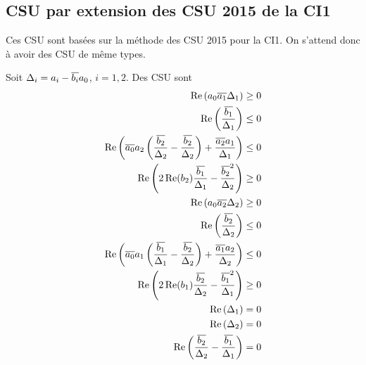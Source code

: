 

\subsection{CSU par extension des CSU 2015 de la CI1}

  Ces CSU sont basées sur la méthode des CSU 2015 pour la CI1. On s'attend donc à avoir des CSU de même types.

  \begin{prop}
    Soit \(\Delta_i = a_i-{\overline{b_i}}a_0\), \(i=1,2\). Des CSU sont
    \begin{align}
      \operatorname{Re}\left(a_0{\overline{a_1}}\Delta_1\right) \ge 0 \\
      \operatorname{Re}\left(\dfrac{{\overline{b_1}}}{\Delta_1}\right) \le 0 \\
      \operatorname{Re}\left({\overline{a_0}}a_2\left(\dfrac{{\overline{b_2}}}{\Delta_2}-\dfrac{{\overline{b_2}}}{\Delta_2}\right) + \dfrac{{\overline{a_2}}a_1}{\Delta_1} \right)\le 0\\
      \operatorname{Re}\left(2\operatorname{Re}(b_2)\dfrac{{\overline{b_1}}}{\Delta_1}-\dfrac{{\overline{b_2}}^2}{\Delta_2}\right) \ge 0\\
      \operatorname{Re}\left(a_0{\overline{a_2}}\Delta_2\right) \ge 0 \\
      \operatorname{Re}\left(\dfrac{{\overline{b_2}}}{\Delta_2}\right) \le 0 \\
      \operatorname{Re}\left({\overline{a_0}}a_1\left(\dfrac{{\overline{b_1}}}{\Delta_1}-\dfrac{{\overline{b_2}}}{\Delta_2}\right) + \dfrac{{\overline{a_1}}a_2}{\Delta_2} \right)\le 0\\
      \operatorname{Re}\left(2\operatorname{Re}(b_1)\dfrac{{\overline{b_2}}}{\Delta_2}-\dfrac{{\overline{b_1}}^2}{\Delta_1}\right) \ge 0\\
      \operatorname{Re}\left(\Delta_1\right) = 0 \\
      \operatorname{Re}\left(\Delta_2\right) = 0 \\
      \operatorname{Re}\left(\dfrac{{\overline{b_2}}}{\Delta_2}-\dfrac{{\overline{b_1}}}{\Delta_1}\right) = 0
    \end{align}
  \end{prop}
  
